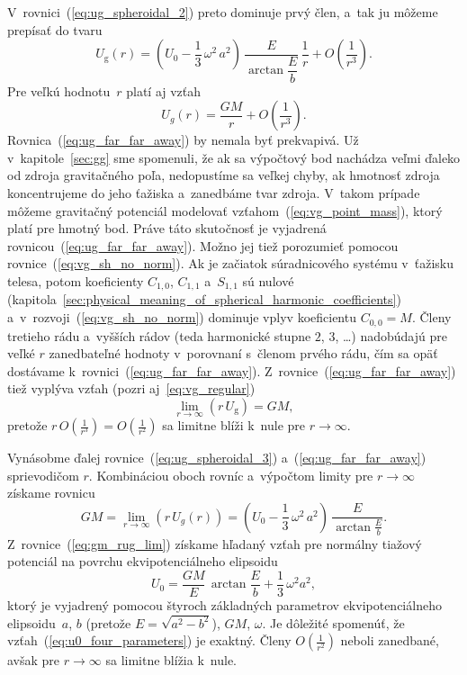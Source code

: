\documentclass[a4paper, 12pt]{book}
\newcommand{\gidx}{\mathrm g}
\begin{document}
V~rovnici~(\ref{eq:ug_spheroidal_2}) preto dominuje prvý člen, a~tak ju môžeme 
prepísať do tvaru
%
\begin{equation}
\label{eq:ug_spheroidal_3}
U_\gidx(r) = \left( U_0 - \frac{1}{3} \, \omega^2 \, a^2 \right) \, 
\frac{E}{\arctan\dfrac{E}{b}} \, \frac{1}{r} + O\left( \frac{1}{r^3} \right){.}
\end{equation}
%
Pre veľkú hodnotu~$r$ platí aj vzťah
%
\begin{equation}
\label{eq:ug_far_far_away}
U_g(r) = \frac{GM}{r} + O\left( \frac{1}{r^3}\right){.}
\end{equation}
%
Rovnica~(\ref{eq:ug_far_far_away}) by nemala byť prekvapivá.  Už 
v~kapitole~\ref{sec:gg} sme spomenuli, že ak sa výpočtový bod nachádza veľmi 
ďaleko od zdroja gravitačného poľa, nedopustíme sa veľkej chyby, ak hmotnosť 
zdroja koncentrujeme do jeho ťažiska a~zanedbáme tvar zdroja.  V~takom prípade 
môžeme gravitačný potenciál modelovať vzťahom~(\ref{eq:vg_point_mass}), ktorý 
platí pre hmotný bod.  Práve táto skutočnosť je vyjadrená 
rovnicou~(\ref{eq:ug_far_far_away}).  Možno jej tiež porozumieť pomocou 
rovnice~(\ref{eq:vg_sh_no_norm}).  Ak je začiatok súradnicového systému 
v~ťažisku telesa, potom koeficienty $C_{1,0}$, $C_{1,1}$ a~$S_{1,1}$ sú nulové 
(kapitola~\ref{sec:physical_meaning_of_spherical_harmonic_coefficients}) 
a~v~rozvoji~(\ref{eq:vg_sh_no_norm}) dominuje vplyv koeficientu $C_{0,0} = M$.  
Členy tretieho rádu a~vyšších rádov (teda harmonické stupne $2$, $3$, \dots) 
nadobúdajú pre veľké $r$ zanedbateľné hodnoty v~porovnaní s~členom prvého rádu, 
čím sa opäť dostávame k~rovnici~(\ref{eq:ug_far_far_away}).  
Z~rovnice~(\ref{eq:ug_far_far_away}) tiež vyplýva vzťah (pozri 
aj~\ref{eq:vg_regular})
%
\begin{equation}
\lim_{r \rightarrow \infty} (r \, U_\gidx) = GM{,}
\end{equation}
%
pretože $r \, O \left( \frac{1}{r^3} \right) = O\left( \frac{1}{r^2} \right)$ 
sa limitne blíži k~nule pre $r \rightarrow \infty$.

Vynásobme ďalej rovnice~(\ref{eq:ug_spheroidal_3}) a~(\ref{eq:ug_far_far_away}) 
sprievodičom $r$.  Kombináciou oboch rovníc a~výpočtom limity pre $r 
\rightarrow \infty$ získame rovnicu
%
\begin{equation}
\label{eq:gm_rug_lim}
GM = \lim_{r \rightarrow \infty} (r \, U_g(r)) = \left( U_0 - \frac{1}{3} \, 
\omega^2 \, a^2 \right) \, \frac{E}{\arctan\frac{E}{b}}{.}
\end{equation}
%
Z~rovnice~(\ref{eq:gm_rug_lim}) získame hľadaný vzťah pre normálny tiažový 
potenciál na povrchu ekvipotenciálneho elipsoidu
%
\begin{equation}
\label{eq:u0_four_parameters}
U_0 = \frac{GM}{E} \, \arctan\frac{E}{b} + \frac{1}{3} \, \omega^2 a^2{,}
\end{equation}
%
ktorý je vyjadrený pomocou štyroch základných parametrov ekvipotenciálneho 
elipsoidu~$a$, $b$ (pretože $E = \sqrt{a^2 - b^2}$), $GM$, $\omega$.  Je 
dôležité spomenúť, že vzťah~(\ref{eq:u0_four_parameters}) je exaktný.  Členy 
$O\left( \frac{1}{r^2} \right)$ neboli zanedbané, avšak pre $r \rightarrow 
\infty$ sa limitne blížia k~nule.
\end{document}

